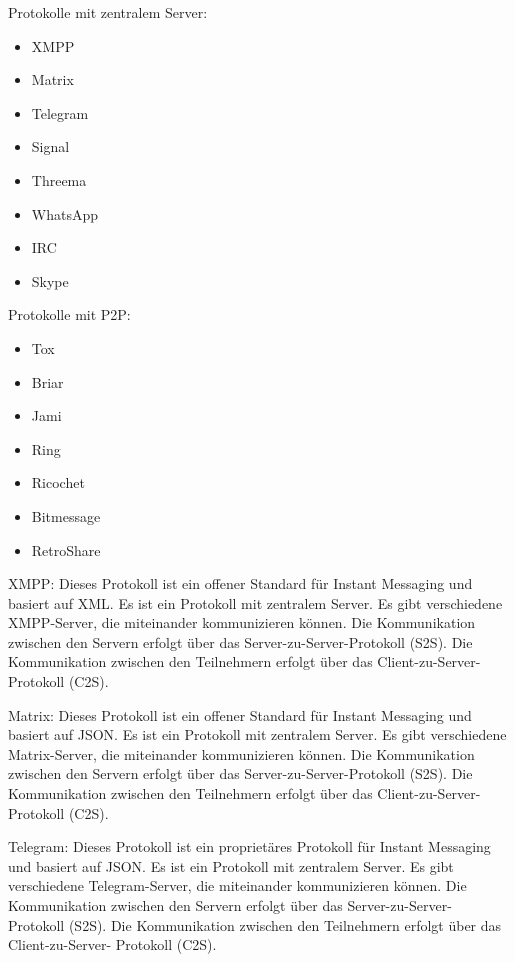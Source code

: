Protokolle mit zentralem Server:

\begin{itemize}
    \item XMPP
    \item Matrix
    \item Telegram
    \item Signal
    \item Threema
    \item WhatsApp
    \item IRC
    \item Skype
\end{itemize}

Protokolle mit P2P:

\begin{itemize}
    \item Tox
    \item Briar
    \item Jami
    \item Ring
    \item Ricochet
    \item Bitmessage
    \item RetroShare
\end{itemize}

XMPP:
Dieses Protokoll ist ein offener Standard für Instant Messaging und basiert auf XML. Es ist ein
Protokoll mit zentralem Server. Es gibt verschiedene XMPP-Server, die miteinander kommunizieren
können. Die Kommunikation zwischen den Servern erfolgt über das Server-zu-Server-Protokoll (S2S).
Die Kommunikation zwischen den Teilnehmern erfolgt über das Client-zu-Server-Protokoll (C2S).

Matrix:
Dieses Protokoll ist ein offener Standard für Instant Messaging und basiert auf JSON. Es ist ein
Protokoll mit zentralem Server. Es gibt verschiedene Matrix-Server, die miteinander kommunizieren
können. Die Kommunikation zwischen den Servern erfolgt über das Server-zu-Server-Protokoll (S2S).
Die Kommunikation zwischen den Teilnehmern erfolgt über das Client-zu-Server-Protokoll (C2S).

Telegram:
Dieses Protokoll ist ein proprietäres Protokoll für Instant Messaging und basiert auf JSON. Es ist
ein Protokoll mit zentralem Server. Es gibt verschiedene Telegram-Server, die miteinander
kommunizieren können. Die Kommunikation zwischen den Servern erfolgt über das Server-zu-Server-
Protokoll (S2S). Die Kommunikation zwischen den Teilnehmern erfolgt über das Client-zu-Server-
Protokoll (C2S).

